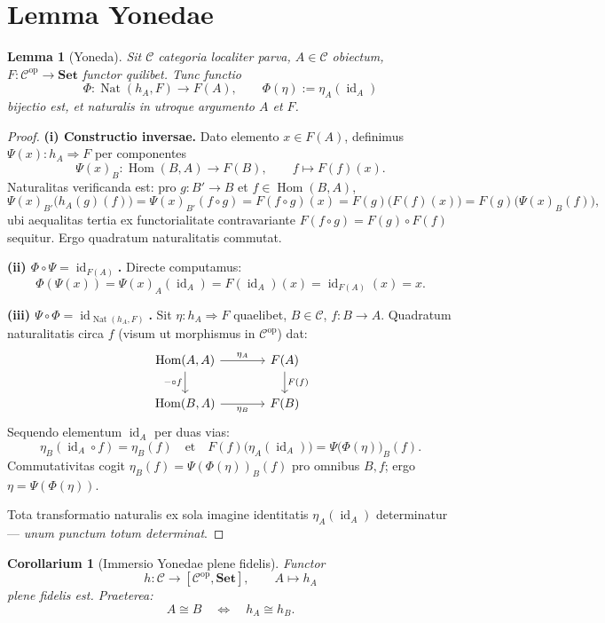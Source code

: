 \documentclass[11pt]{article}
\theoremstyle{plain}
\newtheorem{lemma}[theorema]{Lemma}
\newtheorem{corollarium}[theorema]{Corollarium}
\theoremstyle{definition}
\theoremstyle{remark}
\newcommand{\C}{\mathcal{C}}
\newcommand{\Set}{\mathbf{Set}}
\newcommand{\Hom}{\operatorname{Hom}}
\newcommand{\Nat}{\operatorname{Nat}}
\newcommand{\id}{\operatorname{id}}
\newcommand{\op}{\mathrm{op}}
\newcommand{\yon}{\text{\usefont{U}{min}{m}{n}\symbol{'110}}} %
\renewcommand{\yon}{h}
\begin{document}
\section{Lemma Yonedae}

\begin{lemma}[Yoneda]\label{thm:yoneda}
Sit $\C$ categoria localiter parva, $A \in \C$ obiectum, $F\colon \C^{\op} \to \Set$ functor quilibet. Tunc functio
\[
\Phi\colon \Nat(h_A, F) \longrightarrow F(A), \qquad \Phi(\eta) := \eta_A(\id_A)
\]
bijectio est, et naturalis in utroque argumento $A$ et $F$.
\end{lemma}

\begin{proof}
\textbf{(i) Constructio inversae.} Dato elemento $x \in F(A)$, definimus $\Psi(x)\colon h_A \Rightarrow F$ per componentes
\[
\Psi(x)_B\colon \Hom(B,A) \to F(B), \qquad f \mapsto F(f)(x).
\]
Naturalitas verificanda est: pro $g\colon B' \to B$ et $f \in \Hom(B,A)$,
\[
\Psi(x)_{B'}\bigl(h_A(g)(f)\bigr) = \Psi(x)_{B'}(f \circ g) = F(f \circ g)(x) = F(g)\bigl(F(f)(x)\bigr) = F(g)\bigl(\Psi(x)_B(f)\bigr),
\]
ubi aequalitas tertia ex functorialitate contravariante $F(f \circ g) = F(g) \circ F(f)$ sequitur. Ergo quadratum naturalitatis commutat.

\textbf{(ii) $\Phi \circ \Psi = \id_{F(A)}$.} Directe computamus:
\[
\Phi(\Psi(x)) = \Psi(x)_A(\id_A) = F(\id_A)(x) = \id_{F(A)}(x) = x.
\]

\textbf{(iii) $\Psi \circ \Phi = \id_{\Nat(h_A,F)}$.} Sit $\eta\colon h_A \Rightarrow F$ quaelibet, $B \in \C$, $f\colon B \to A$. Quadratum naturalitatis circa $f$ (visum ut morphismus in $\C^{\op}$) dat:
\[
\begin{tikzcd}[column sep=large]
\Hom(A,A) \arrow[r, "\eta_A"] \arrow[d, "-\circ f"'] & F(A) \arrow[d, "F(f)"] \\
\Hom(B,A) \arrow[r, "\eta_B"'] & F(B)
\end{tikzcd}
\]
Sequendo elementum $\id_A$ per duas vias:
\[
\eta_B(\id_A \circ f) = \eta_B(f) \quad\text{et}\quad F(f)\bigl(\eta_A(\id_A)\bigr) = \Psi\bigl(\Phi(\eta)\bigr)_B(f).
\]
Commutativitas cogit $\eta_B(f) = \Psi(\Phi(\eta))_B(f)$ pro omnibus $B, f$; ergo $\eta = \Psi(\Phi(\eta))$.

Tota transformatio naturalis ex sola imagine identitatis $\eta_A(\id_A)$ determinatur --- \emph{unum punctum totum determinat}.
\end{proof}

\begin{corollarium}[Immersio Yonedae plene fidelis]\label{cor:embedding}
Functor
\[
\yon\colon \C \longrightarrow [\C^{\op}, \Set], \qquad A \mapsto h_A
\]
plene fidelis est. Praeterea:
\[
A \cong B \quad\Longleftrightarrow\quad h_A \cong h_B.
\]
\end{corollarium}
\end{document}
